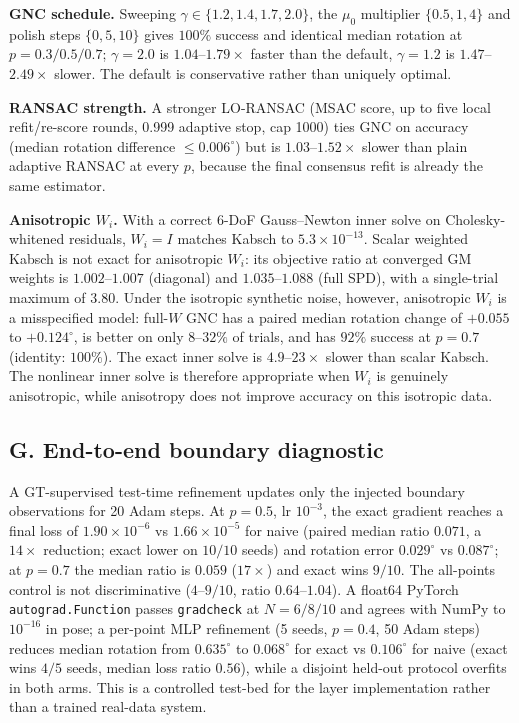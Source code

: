 \noindent\textbf{GNC schedule.} Sweeping $\gamma\in\{1.2,1.4,1.7,2.0\}$, the $\mu_0$ multiplier
$\{0.5,1,4\}$ and polish steps $\{0,5,10\}$ gives $100\%$ success and identical median rotation at
$p=0.3/0.5/0.7$; $\gamma=2.0$ is $1.04$--$1.79\times$ faster than the default, $\gamma=1.2$ is
$1.47$--$2.49\times$ slower. The default is conservative rather than uniquely optimal.

\noindent\textbf{RANSAC strength.} A stronger LO-RANSAC (MSAC score, up to five local refit/re-score
rounds, 0.999 adaptive stop, cap 1000) ties GNC on accuracy (median rotation difference
$\le0.006^\circ$) but is $1.03$--$1.52\times$ slower than plain adaptive RANSAC at every $p$, because
the final consensus refit is already the same estimator.

\noindent\textbf{Anisotropic $W_i$.} With a correct 6-DoF Gauss--Newton inner solve on
Cholesky-whitened residuals, $W_i=I$ matches Kabsch to $5.3\times10^{-13}$. Scalar weighted Kabsch
is not exact for anisotropic $W_i$: its objective ratio at converged GM weights is
$1.002$--$1.007$ (diagonal) and $1.035$--$1.088$ (full SPD), with a single-trial maximum of $3.80$.
Under the isotropic synthetic noise, however, anisotropic $W_i$ is a misspecified model: full-$W$
GNC has a paired median rotation change of $+0.055$ to $+0.124^\circ$, is better on only
$8$--$32\%$ of trials, and has $92\%$ success at $p=0.7$ (identity: $100\%$). The exact inner solve
is $4.9$--$23\times$ slower than scalar Kabsch. The nonlinear inner solve is therefore appropriate
when $W_i$ is genuinely anisotropic, while anisotropy does not improve accuracy on this isotropic
data.

\subsection*{G. End-to-end boundary diagnostic}
\label{app:e2e}

A GT-supervised test-time refinement updates only the injected boundary observations for 20 Adam
steps. At $p=0.5$, lr $10^{-3}$, the exact gradient reaches a final loss of $1.90\times10^{-6}$ vs
$1.66\times10^{-5}$ for naive (paired median ratio $0.071$, a $14\times$ reduction; exact lower on
$10/10$ seeds) and rotation error $0.029^\circ$ vs $0.087^\circ$; at $p=0.7$ the median ratio is
$0.059$ ($17\times$) and exact wins $9/10$. The all-points control is not discriminative
($4$--$9/10$, ratio $0.64$--$1.04$). A float64 PyTorch \texttt{autograd.Function} passes
\texttt{gradcheck} at $N=6/8/10$ and agrees with NumPy to $10^{-16}$ in pose; a per-point MLP
refinement (5 seeds, $p=0.4$, 50 Adam steps) reduces median rotation from $0.635^\circ$ to
$0.068^\circ$ for exact vs $0.106^\circ$ for naive (exact wins $4/5$ seeds, median loss ratio
$0.56$), while a disjoint held-out protocol overfits in both arms. This is a controlled test-bed for
the layer implementation rather than a trained real-data system.

